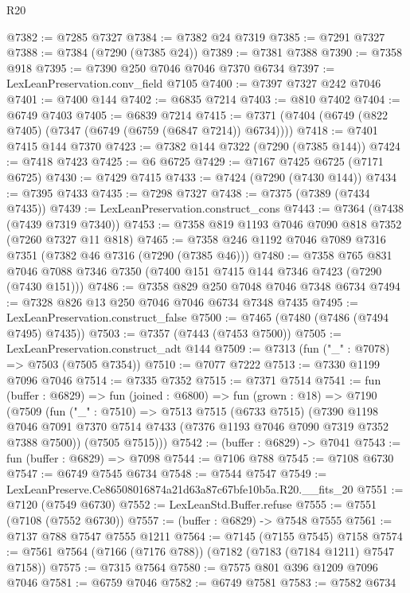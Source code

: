 \begin{lexlean}{R20}
\begin{coremodule}
{@7382 := @7285 @7327
@7384 := @7382 @24 @7319
@7385 := @7291 @7327
@7388 := @7384 (@7290 (@7385 @24))
@7389 := @7381 @7388
@7390 := @7358 @918
@7395 := @7390 @250 @7046 @7046 @7370 @6734
@7397 := LexLeanPreservation.conv_field @7105
@7400 := @7397 @7327 @242 @7046
@7401 := @7400 @144
@7402 := @6835 @7214
@7403 := @810 @7402
@7404 := @6749 @7403
@7405 := @6839 @7214
@7415 := @7371 (@7404 (@6749 (@822 @7405) (@7347 (@6749 (@6759 (@6847 @7214)) @6734))))
@7418 := @7401 @7415 @144 @7370
@7423 := @7382 @144 @7322 (@7290 (@7385 @144))
@7424 := @7418 @7423
@7425 := @6 @6725
@7429 := @7167 @7425 @6725 (@7171 @6725)
@7430 := @7429 @7415
@7433 := @7424 (@7290 (@7430 @144))
@7434 := @7395 @7433
@7435 := @7298 @7327
@7438 := @7375 (@7389 (@7434 @7435))
@7439 := LexLeanPreservation.construct_cons
@7443 := @7364 (@7438 (@7439 @7319 @7340))
@7453 := @7358 @819 @1193 @7046 @7090 @818 @7352 (@7260 @7327 @11 @818)
@7465 := @7358 @246 @1192 @7046 @7089 @7316 @7351 (@7382 @46 @7316 (@7290 (@7385 @46)))
@7480 := @7358
    @765
    @831
    @7046
    @7088
    @7346
    @7350
    (@7400 @151 @7415 @144 @7346 @7423 (@7290 (@7430 @151)))
@7486 := @7358 @829 @250 @7048 @7046 @7348 @6734
@7494 := @7328 @826 @13 @250 @7046 @7046 @6734 @7348 @7435
@7495 := LexLeanPreservation.construct_false
@7500 := @7465 (@7480 (@7486 (@7494 @7495) @7435))
@7503 := @7357 (@7443 (@7453 @7500))
@7505 := LexLeanPreservation.construct_adt @144
@7509 := @7313 (fun ("_" : @7078) => @7503 (@7505 @7354))
@7510 := @7077 @7222
@7513 := @7330 @1199 @7096 @7046
@7514 := @7335 @7352
@7515 := @7371 @7514
@7541 := fun (buffer : @6829) =>
  fun (joined : @6800) =>
  fun (grown : @18) =>
  @7190
    (@7509
      (fun ("_" : @7510) =>
      @7513
        @7515
        (@6733 @7515)
        (@7390
          @1198
          @7046
          @7091
          @7370
          @7514
          @7433
          (@7376 @1193 @7046 @7090 @7319 @7352 @7388 @7500))
        (@7505 @7515)))
@7542 := (buffer : @6829) -> @7041
@7543 := fun (buffer : @6829) => @7098
@7544 := @7106 @788
@7545 := @7108 @6730
@7547 := @6749 @7545 @6734
@7548 := @7544 @7547
@7549 := LexLeanPreserve.Ce86508016874a21d63a87c67bfe10b5a.R20.__fits_20
@7551 := @7120 (@7549 @6730)
@7552 := LexLeanStd.Buffer.refuse
@7555 := @7551 (@7108 (@7552 @6730))
@7557 := (buffer : @6829) -> @7548 @7555
@7561 := @7137 @788 @7547 @7555 @1211
@7564 := @7145 (@7155 @7545) @7158
@7574 := @7561 @7564 (@7166 (@7176 @788)) (@7182 (@7183 (@7184 @1211) @7547 @7158))
@7575 := @7315 @7564
@7580 := @7575 @801 @396 @1209 @7096 @7046
@7581 := @6759 @7046
@7582 := @6749 @7581
@7583 := @7582 @6734
}
\end{coremodule}
\end{lexlean}
